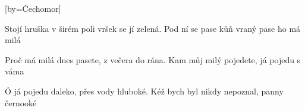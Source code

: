 [by={Čechomor}]

\beginverse{}
Stojí hruška v širém poli
vršek se jí zelená.
\lrep{} Pod ní se pase kůň vraný
pase ho má milá \rrep{}
\endverse{}

\beginverse{}
\chordsoff{}
Proč má milá dnes pasete,
z večera do rána.
\lrep{} Kam můj milý pojedete,
já pojedu s váma \rrep{}
\chordson{}
\endverse{}

\beginverse{}
\chordsoff{}
Ó já pojedu daleko,
přes vody hluboké.
\lrep{} Kéž bych byl nikdy nepoznal,
panny černooké \rrep{}
\chordson{}
\endverse{}

\endsong{}
